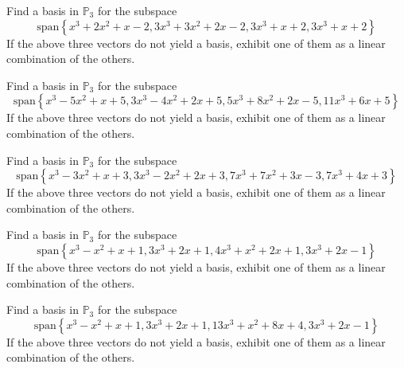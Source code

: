 \documentclass{ximera}
\begin{document}
\begin{problem}\label{prb:10.33} Find a basis in $\mathbb{P}_{3}$ for the subspace
\begin{equation*}
\mbox{span}\left\{
x^{3}+2x^{2}+x-2,3x^{3}+3x^{2}+2x-2,3x^{3}+x+2,3x^{3}+x+2\right\}
\end{equation*}
If the above three vectors do not yield a basis, exhibit one of them as a
linear combination of the others.
\end{problem}


\begin{problem}\label{prb:10.34} Find a basis in $\mathbb{P}_{3}$ for the subspace
\begin{equation*}
\mbox{span}\left\{
x^{3}-5x^{2}+x+5,3x^{3}-4x^{2}+2x+5,5x^{3}+8x^{2}+2x-5,11x^{3}+6x+5\right\}
\end{equation*}
If the above three vectors do not yield a basis, exhibit one of them as a
linear combination of the others.
\end{problem}


\begin{problem}\label{prb:10.35} Find a basis in $\mathbb{P}_{3}$ for the subspace
\begin{equation*}
\mbox{span}\left\{
x^{3}-3x^{2}+x+3,3x^{3}-2x^{2}+2x+3,7x^{3}+7x^{2}+3x-3,7x^{3}+4x+3\right\}
\end{equation*}
If the above three vectors do not yield a basis, exhibit one
of them as a linear combination of the others.
\end{problem}


\begin{problem}\label{prb:10.36} Find a basis in $\mathbb{P}_{3}$ for the subspace
\begin{equation*}
\mbox{span}\left\{
x^{3}-x^{2}+x+1,3x^{3}+2x+1,4x^{3}+x^{2}+2x+1,3x^{3}+2x-1\right\}
\end{equation*}
If the above three vectors do not yield a basis, exhibit one
of them as a linear combination of the others.
\end{problem}


\begin{problem}\label{prb:10.37} Find a basis in $\mathbb{P}_{3}$ for the subspace
\begin{equation*}
\mbox{span}\left\{
x^{3}-x^{2}+x+1,3x^{3}+2x+1,13x^{3}+x^{2}+8x+4,3x^{3}+2x-1\right\}
\end{equation*}
If the above three vectors do not yield a basis, exhibit one
of them as a linear combination of the others.
\end{problem}
\end{document}
